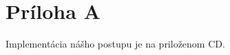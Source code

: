 \appendix\chapter*{Príloha A} 
\label{app:implementacia}
Implementácia nášho postupu je na priloženom CD.